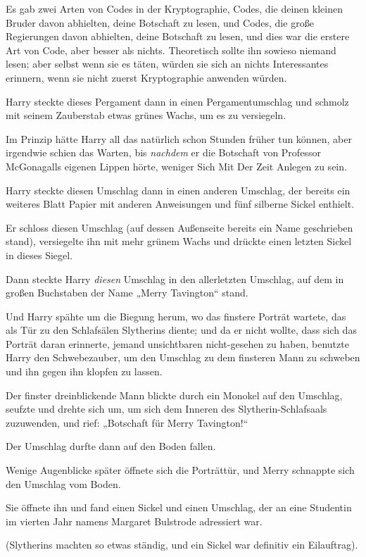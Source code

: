 {Es gab zwei Arten von Codes in der Kryptographie, Codes, die deinen kleinen Bruder davon abhielten, deine Botschaft zu lesen, und Codes, die große Regierungen davon abhielten, deine Botschaft zu lesen, und dies war die erstere Art von Code, aber besser als nichts. Theoretisch sollte ihn sowieso niemand lesen; aber selbst wenn sie es täten, würden sie sich an nichts Interessantes erinnern, wenn sie nicht zuerst Kryptographie anwenden würden.

Harry steckte dieses Pergament dann in einen Pergamentumschlag und schmolz mit seinem Zauberstab etwas grünes Wachs, um es zu versiegeln.

Im Prinzip hätte Harry all das natürlich schon Stunden früher tun können, aber irgendwie schien das Warten, bis \emph{nachdem} er die Botschaft von Professor McGonagalls eigenen Lippen hörte, weniger Sich Mit Der Zeit Anlegen zu sein.

Harry steckte diesen Umschlag dann in einen anderen Umschlag, der bereits ein weiteres Blatt Papier mit anderen Anweisungen und fünf silberne Sickel enthielt.

Er schloss diesen Umschlag (auf dessen Außenseite bereits ein Name geschrieben stand), versiegelte ihn mit mehr grünem Wachs und drückte einen letzten Sickel in dieses Siegel.

Dann steckte Harry \emph{diesen} Umschlag in den allerletzten Umschlag, auf dem in großen Buchstaben der Name „Merry Tavington“ stand.

Und Harry spähte um die Biegung herum, wo das finstere Porträt wartete, das als Tür zu den Schlafsälen Slytherins diente; und da er nicht wollte, dass sich das Porträt daran erinnerte, jemand unsichtbaren nicht-gesehen zu haben, benutzte Harry den Schwebezauber, um den Umschlag zu dem finsteren Mann zu schweben und ihn gegen ihn klopfen zu lassen.

Der finster dreinblickende Mann blickte durch ein Monokel auf den Umschlag, seufzte und drehte sich um, um sich dem Inneren des Slytherin-Schlafsaals zuzuwenden, und rief: „Botschaft für Merry Tavington!“

Der Umschlag durfte dann auf den Boden fallen.

Wenige Augenblicke später öffnete sich die Porträttür, und Merry schnappte sich den Umschlag vom Boden.

Sie öffnete ihn und fand einen Sickel und einen Umschlag, der an eine Studentin im vierten Jahr namens Margaret Bulstrode adressiert war.

(Slytherins machten so etwas ständig, und ein Sickel war definitiv ein Eilauftrag).

}

